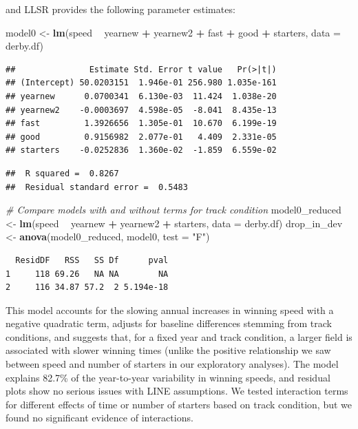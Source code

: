 \documentclass[
]{krantz}
\newenvironment{Shaded}{\begin{snugshade}}{\end{snugshade}}
\newcommand{\CommentTok}[1]{\textcolor[rgb]{0.37,0.37,0.37}{\textit{#1}}}
\newcommand{\DataTypeTok}[1]{\textcolor[rgb]{0.27,0.27,0.27}{#1}}
\newcommand{\KeywordTok}[1]{\textcolor[rgb]{0.27,0.27,0.27}{\textbf{#1}}}
\newcommand{\NormalTok}[1]{#1}
\newcommand{\OperatorTok}[1]{\textcolor[rgb]{0.43,0.43,0.43}{\textbf{#1}}}
\newcommand{\StringTok}[1]{\textcolor[rgb]{0.5,0.5,0.5}{#1}}
\begin{document}
and LLSR provides the following parameter estimates:

\begin{Shaded}
\begin{Highlighting}[]
\NormalTok{model0 <-}\StringTok{ }\KeywordTok{lm}\NormalTok{(speed }\OperatorTok{~}\StringTok{ }\NormalTok{yearnew }\OperatorTok{+}\StringTok{ }\NormalTok{yearnew2 }\OperatorTok{+}\StringTok{ }\NormalTok{fast }\OperatorTok{+}\StringTok{ }\NormalTok{good }\OperatorTok{+}
\StringTok{               }\NormalTok{starters, }\DataTypeTok{data =}\NormalTok{ derby.df)}
\end{Highlighting}
\end{Shaded}

\begin{verbatim}
##               Estimate Std. Error t value   Pr(>|t|)
## (Intercept) 50.0203151  1.946e-01 256.980 1.035e-161
## yearnew      0.0700341  6.130e-03  11.424  1.038e-20
## yearnew2    -0.0003697  4.598e-05  -8.041  8.435e-13
## fast         1.3926656  1.305e-01  10.670  6.199e-19
## good         0.9156982  2.077e-01   4.409  2.331e-05
## starters    -0.0252836  1.360e-02  -1.859  6.559e-02
\end{verbatim}

\begin{verbatim}
##  R squared =  0.8267 
##  Residual standard error =  0.5483
\end{verbatim}

\begin{Shaded}
\begin{Highlighting}[]
\CommentTok{# Compare models with and without terms for track condition}
\NormalTok{model0_reduced <-}\StringTok{ }\KeywordTok{lm}\NormalTok{(speed }\OperatorTok{~}\StringTok{ }\NormalTok{yearnew }\OperatorTok{+}\StringTok{ }\NormalTok{yearnew2 }\OperatorTok{+}\StringTok{ }
\StringTok{                       }\NormalTok{starters, }\DataTypeTok{data =}\NormalTok{ derby.df)}
\NormalTok{drop_in_dev <-}\StringTok{ }\KeywordTok{anova}\NormalTok{(model0_reduced, model0, }\DataTypeTok{test =} \StringTok{"F"}\NormalTok{)}
\end{Highlighting}
\end{Shaded}

\begin{verbatim}
  ResidDF   RSS   SS Df      pval
1     118 69.26   NA NA        NA
2     116 34.87 57.2  2 5.194e-18
\end{verbatim}

This model accounts for the slowing annual increases in winning speed with a negative quadratic term, adjusts for baseline differences stemming from track conditions, and suggests that, for a fixed year and track condition, a larger field is associated with slower winning times (unlike the positive relationship we saw between speed and number of starters in our exploratory analyses). The model explains 82.7\% of the year-to-year variability in winning speeds, and residual plots show no serious issues with LINE assumptions. We tested interaction terms for different effects of time or number of starters based on track condition, but we found no significant evidence of interactions.
\end{document}
